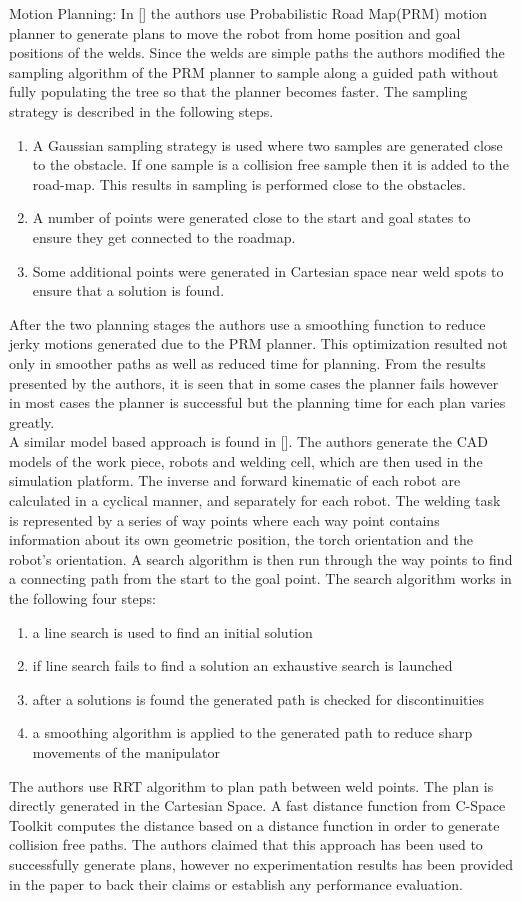 Motion Planning: In [\citet{Larkin2016}] the authors use Probabilistic Road Map(PRM) motion planner to generate plans to move the robot from home position and goal positions of the welds. Since the welds are simple paths the authors modified the sampling algorithm of the PRM planner to sample along a guided path without fully populating the tree so that the planner becomes faster. The sampling strategy is described in the following steps.
\begin{enumerate}
\item A Gaussian sampling strategy is used where two samples are generated close to the obstacle. If one sample is a collision free sample then it is added to the road-map. This results in sampling is performed close to the obstacles.
\item A number of points were generated close to the start and goal states to ensure they get connected to the roadmap.
\item Some additional points were generated in Cartesian space near weld spots to ensure that a solution is found.
\end{enumerate}
After the two planning stages the authors use a smoothing function to reduce jerky motions generated due to the PRM planner. This optimization resulted not only in smoother paths as well as reduced time for planning. From the results presented by the authors, it is seen that in some cases the planner fails however in most cases the planner is successful but the planning time for each plan varies greatly. \\
A similar model based approach is found in [\citet{Ames}]. The authors generate the CAD models of the work piece, robots and welding cell, which are then used in the simulation platform. The inverse and forward kinematic of each robot are calculated in a cyclical manner, and separately for each robot. The welding task is represented by a series of way points where each way point contains information about its own geometric position, the torch orientation and the robot's orientation. A search algorithm is then run through the way points to find a connecting path from the start to the goal point. The search algorithm works in the following four steps:
\begin{enumerate}
\item a line search is used to find an initial solution
\item if line search fails to find a solution an exhaustive search is launched
\item after a solutions is found the generated path is checked for discontinuities
\item a smoothing algorithm is applied to the generated path to reduce sharp movements of the manipulator
\end{enumerate}
The authors use RRT algorithm to plan path between weld points. The plan is directly generated in the Cartesian Space. A fast distance function from C-Space Toolkit computes the distance based on a distance function in order to generate collision free paths. The authors claimed that this approach has been used to successfully generate plans, however no experimentation results has been provided in the paper to back their claims or establish any performance evaluation. 
